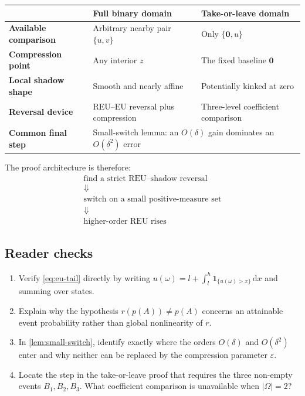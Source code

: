 \documentclass[11pt,a4paper]{article}
\theoremstyle{definition}
\newcommand{\dd}{\,\mathrm d}
\newcommand{\ind}{\mathbf 1}
\newcommand{\zero}{\mathbf 0}
\begin{document}
\begin{center}
\renewcommand{\arraystretch}{1.25}
\begin{tabularx}{\textwidth}{>{\raggedright\arraybackslash\bfseries}p{}XX}
\toprule
 & Full binary domain & Take-or-leave domain \\
\midrule
Available comparison & Arbitrary nearby pair $\{u,v\}$ & Only $\{\zero,u\}$ \\
Compression point & Any interior $z$ & The fixed baseline $\zero$ \\
Local shadow shape & Smooth and nearly affine & Potentially kinked at zero \\
Reversal device & REU--EU reversal plus compression & Three-level coefficient comparison \\
Common final step & \multicolumn{2}{l}{Small-switch lemma: an $O(\delta)$ gain dominates an $O(\delta^2)$ error} \\
\bottomrule
\end{tabularx}
\end{center}

The proof architecture is therefore:
\[
 \boxed{
 \begin{gathered}
  \text{find a strict REU--shadow reversal}\\[2pt]
  \Downarrow\\[-1pt]
  \text{switch on a small positive-measure set}\\[2pt]
  \Downarrow\\[-1pt]
  \text{higher-order REU rises}
 \end{gathered}}
\]

\subsection*{Reader checks}

\begin{enumerate}
 \item Verify \eqref{eq:eu-tail} directly by writing
       $u(\omega)=l+\int_l^h\ind_{\{u(\omega)>x\}}\dd x$ and summing over
       states.
 \item Explain why the hypothesis $r(p(A))\neq p(A)$ concerns an attainable
       event probability rather than global nonlinearity of $r$.
 \item In \cref{lem:small-switch}, identify exactly where the orders
       $O(\delta)$ and $O(\delta^2)$ enter and why neither can be replaced by
       the compression parameter $\varepsilon$.
 \item Locate the step in the take-or-leave proof that requires the three
       non-empty events $B_1,B_2,B_3$. What coefficient comparison is
       unavailable when $|\Omega|=2$?
\end{enumerate}
\end{document}
